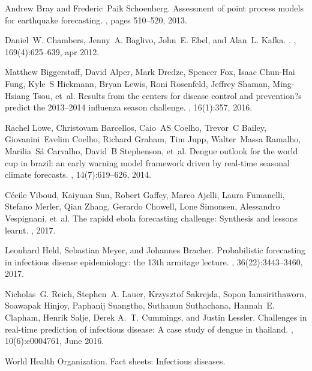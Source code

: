 \documentclass[a4paper]{article}
\begin{document}
\begin{thebibliography}{100}
Andrew Bray and Frederic~Paik Schoenberg.
\newblock Assessment of point process models for earthquake forecasting.
, pages 510--520, 2013.

Daniel~W. Chambers, Jenny~A. Baglivo, John~E. Ebel, and Alan~L. Kafka.
.
, 169(4):625--639, apr 2012.

Matthew Biggerstaff, David Alper, Mark Dredze, Spencer Fox, Isaac Chun-Hai
  Fung, Kyle~S Hickmann, Bryan Lewis, Roni Rosenfeld, Jeffrey Shaman,
  Ming-Hsiang Tsou, et~al.
\newblock Results from the centers for disease control and prevention?s
  predict the 2013--2014 influenza season challenge.
, 16(1):357, 2016.

Rachel Lowe, Christovam Barcellos, Caio~AS Coelho, Trevor~C Bailey,
  Giovanini~Evelim Coelho, Richard Graham, Tim Jupp, Walter~Massa Ramalho,
  Marilia~S{\'a} Carvalho, David~B Stephenson, et~al.
\newblock Dengue outlook for the world cup in brazil: an early warning model
  framework driven by real-time seasonal climate forecasts.
, 14(7):619--626, 2014.

C{\'e}cile Viboud, Kaiyuan Sun, Robert Gaffey, Marco Ajelli, Laura Fumanelli,
  Stefano Merler, Qian Zhang, Gerardo Chowell, Lone Simonsen, Alessandro
  Vespignani, et~al.
\newblock The rapidd ebola forecasting challenge: Synthesis and lessons learnt.
, 2017.

Leonhard Held, Sebastian Meyer, and Johannes Bracher.
\newblock Probabilistic forecasting in infectious disease epidemiology: the
  13th armitage lecture.
, 36(22):3443--3460, 2017.

Nicholas~G. Reich, Stephen~A. Lauer, Krzysztof Sakrejda, Sopon Iamsirithaworn,
  Soawapak Hinjoy, Paphanij Suangtho, Suthanun Suthachana, Hannah~E. Clapham,
  Henrik Salje, Derek A.~T. Cummings, and Justin Lessler.
\newblock Challenges in real-time prediction of infectious disease: A case
  study of dengue in thailand.
, 10(6):e0004761, June 2016.

{World Health Organization}.
\newblock Fact sheets: Infectious diseases.


\end{thebibliography}
\end{document}
